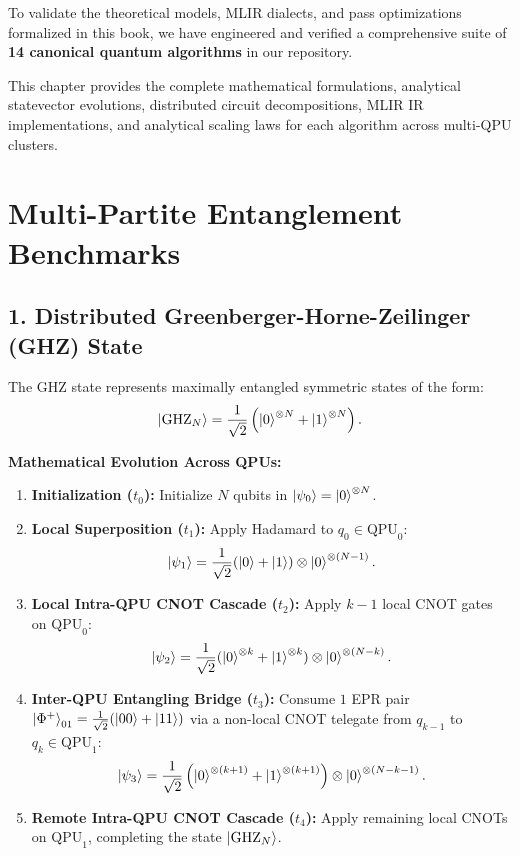 To validate the theoretical models, MLIR dialects, and pass optimizations formalized in this book, we have engineered and verified a comprehensive suite of \textbf{14 canonical quantum algorithms} in our repository. 

This chapter provides the complete mathematical formulations, analytical statevector evolutions, distributed circuit decompositions, MLIR IR implementations, and analytical scaling laws for each algorithm across multi-QPU clusters.

\section{Multi-Partite Entanglement Benchmarks}
\label{sec:entanglement_suite}

\subsection{1. Distributed Greenberger-Horne-Zeilinger (GHZ) State}
The GHZ state represents maximally entangled symmetric states of the form:
\begin{equation}
    \ket{\text{GHZ}_N} = \frac{1}{\sqrt{2}} \left( \ket{0}^{\otimes N} + \ket{1}^{\otimes N} \right).
    \label{eq:ghz_def_ch10}
\end{equation}

\noindent \textbf{Mathematical Evolution Across QPUs:}
\begin{enumerate}
    \item \textbf{Initialization ($t_0$):} Initialize $N$ qubits in $\ket{\psi_0} = \ket{0}^{\otimes N}$.
    \item \textbf{Local Superposition ($t_1$):} Apply Hadamard to $q_0 \in \text{QPU}_0$:
    \begin{equation}
        \ket{\psi_1} = \frac{1}{\sqrt{2}}(\ket{0} + \ket{1}) \otimes \ket{0}^{\otimes (N-1)}.
    \end{equation}
    \item \textbf{Local Intra-QPU CNOT Cascade ($t_2$):} Apply $k-1$ local CNOT gates on $\text{QPU}_0$:
    \begin{equation}
        \ket{\psi_2} = \frac{1}{\sqrt{2}}(\ket{0}^{\otimes k} + \ket{1}^{\otimes k}) \otimes \ket{0}^{\otimes (N-k)}.
    \end{equation}
    \item \textbf{Inter-QPU Entangling Bridge ($t_3$):} Consume $1$ EPR pair $\ket{\Phi^+}_{01} = \frac{1}{\sqrt{2}}(\ket{00} + \ket{11})$ via a non-local CNOT telegate from $q_{k-1}$ to $q_k \in \text{QPU}_1$:
    \begin{equation}
        \ket{\psi_3} = \frac{1}{\sqrt{2}}\left(\ket{0}^{\otimes (k+1)} + \ket{1}^{\otimes (k+1)}\right) \otimes \ket{0}^{\otimes (N-k-1)}.
    \end{equation}
    \item \textbf{Remote Intra-QPU CNOT Cascade ($t_4$):} Apply remaining local CNOTs on $\text{QPU}_1$, completing the state $\ket{\text{GHZ}_N}$.
\end{enumerate}

